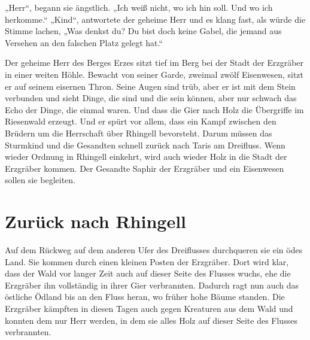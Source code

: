 „Herr“, begann sie ängstlich. „Ich weiß nicht, wo ich hin soll. Und wo ich herkomme.“
„Kind“, antwortete der geheime Herr und es klang fast, als würde die Stimme lachen, „Was denkst du? Du bist doch keine Gabel, die jemand aus Versehen an den falschen Platz gelegt hat.“

Der geheime Herr des Berges Erzes sitzt tief im Berg bei der Stadt der Erzgräber in einer weiten Höhle. Bewacht von seiner Garde, zweimal zwölf Eisenwesen, sitzt er auf seinem eisernen Thron. Seine Augen sind trüb, aber er ist mit dem Stein verbunden und sieht Dinge, die sind und die sein können, aber nur schwach das Echo der Dinge, die einmal waren. Und dass die Gier nach Holz die Übergriffe im Riesenwald erzeugt. Und er spürt vor allem, dass ein Kampf zwischen den Brüdern um die Herrschaft über Rhingell bevorsteht. Darum müssen das Sturmkind und die Gesandten schnell zurück nach Taris am Dreifluss. Wenn wieder Ordnung in Rhingell einkehrt, wird auch wieder Holz in die Stadt der Erzgräber kommen. Der Gesandte Saphir der Erzgräber und ein Eisenwesen sollen sie begleiten.

\section{Zurück nach Rhingell}
Auf dem Rückweg auf dem anderen Ufer des Dreiflusses durchqueren sie ein ödes Land. Sie kommen durch einen kleinen Posten der Erzgräber. Dort wird klar, dass der Wald vor langer Zeit auch auf dieser Seite des Flusses wuchs, ehe die Erzgräber ihn vollständig in ihrer Gier verbrannten. Dadurch ragt nun auch das östliche Ödland bis an den Fluss heran, wo früher hohe Bäume standen. Die Erzgräber kämpften in diesen Tagen auch gegen Kreaturen aus dem Wald und konnten dem nur Herr werden, in dem sie alles Holz auf dieser Seite des Flusses verbrannten.